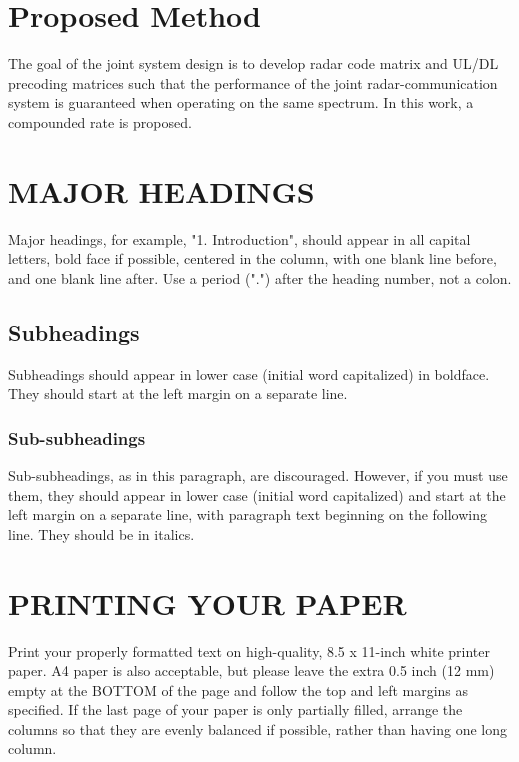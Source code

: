 \documentclass[conference]{IEEEtran}
\begin{document}
\section{Proposed Method}
\label{sec:proposed method}
The goal of the joint system design is to develop radar code matrix and UL/DL precoding matrices such that the performance of the joint radar-communication system is guaranteed when operating on the same spectrum. In this work, a compounded rate is proposed. 

\section{MAJOR HEADINGS}
\label{sec:majhead}

Major headings, for example, "1. Introduction", should appear in all capital
letters, bold face if possible, centered in the column, with one blank line
before, and one blank line after. Use a period (".") after the heading number,
not a colon.

\subsection{Subheadings}
\label{ssec:subhead}

Subheadings should appear in lower case (initial word capitalized) in
boldface.  They should start at the left margin on a separate line.
 
\subsubsection{Sub-subheadings}
\label{sssec:subsubhead}

Sub-subheadings, as in this paragraph, are discouraged. However, if you
must use them, they should appear in lower case (initial word
capitalized) and start at the left margin on a separate line, with paragraph
text beginning on the following line.  They should be in italics.

\section{PRINTING YOUR PAPER}
\label{sec:print}

Print your properly formatted text on high-quality, 8.5 x 11-inch white printer
paper. A4 paper is also acceptable, but please leave the extra 0.5 inch (12 mm)
empty at the BOTTOM of the page and follow the top and left margins as
specified.  If the last page of your paper is only partially filled, arrange
the columns so that they are evenly balanced if possible, rather than having
one long column.
\end{document}
